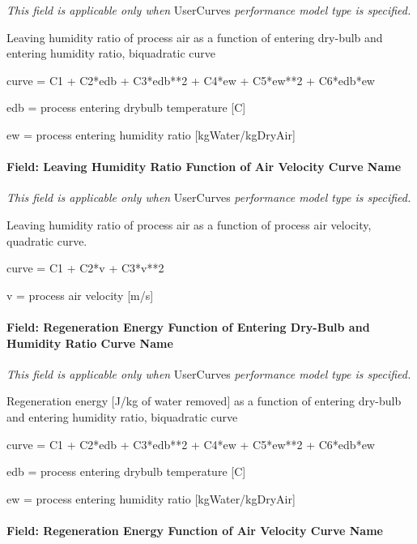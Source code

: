 \emph{This field is applicable only when} UserCurves \emph{performance model type is specified.}

Leaving humidity ratio of process air as a function of entering dry-bulb and entering humidity ratio, biquadratic curve

curve = C1 + C2*edb + C3*edb**2 + C4*ew + C5*ew**2 + C6*edb*ew

edb = process entering drybulb temperature {[}C{]}

ew = process entering humidity ratio {[}kgWater/kgDryAir{]}

\paragraph{Field: Leaving Humidity Ratio Function of Air Velocity Curve Name}\label{field-leaving-humidity-ratio-function-of-air-velocity-curve-name}

\emph{This field is applicable only when} UserCurves \emph{performance model type is specified.}

Leaving humidity ratio of process air as a function of process air velocity, quadratic curve.

curve = C1 + C2*v + C3*v**2

v = process air velocity {[}m/s{]}

\paragraph{Field: Regeneration Energy Function of Entering Dry-Bulb and Humidity Ratio Curve Name}\label{field-regeneration-energy-function-of-entering-dry-bulb-and-humidity-ratio-curve-name}

\emph{This field is applicable only when} UserCurves \emph{performance model type is specified.}

Regeneration energy {[}J/kg of water removed{]} as a function of entering dry-bulb and entering humidity ratio, biquadratic curve

curve = C1 + C2*edb + C3*edb**2 + C4*ew + C5*ew**2 + C6*edb*ew

edb = process entering drybulb temperature {[}C{]}

ew = process entering humidity ratio {[}kgWater/kgDryAir{]}

\paragraph{Field: Regeneration Energy Function of Air Velocity Curve Name}\label{field-regeneration-energy-function-of-air-velocity-curve-name}

